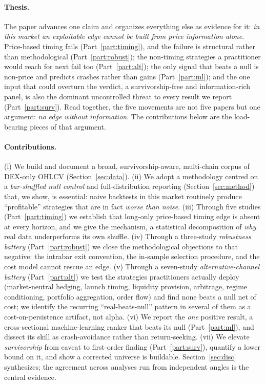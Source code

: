\documentclass[12pt]{article}
\begin{document}
\paragraph{Thesis.} The paper advances one claim and organizes everything else as evidence for it: \emph{in this market an exploitable edge cannot be built from price information alone}. Price-based timing fails (Part~\ref{part:timing}), and the failure is structural rather than methodological (Part~\ref{part:robust}); the non-timing strategies a practitioner would reach for next fail too (Part~\ref{part:alt}); the only signal that beats a null is non-price and predicts crashes rather than gains (Part~\ref{part:ml}); and the one input that could overturn the verdict, a survivorship-free and information-rich panel, is also the dominant uncontrolled threat to every result we report (Part~\ref{part:surv}). Read together, the five movements are not five papers but one argument: \emph{no edge without information}. The contributions below are the load-bearing pieces of that argument.

\paragraph{Contributions.} (i) We build and document a broad, survivorship-aware, multi-chain corpus of DEX-only OHLCV (Section~\ref{sec:data}). (ii) We adopt a methodology centred on a \emph{bar-shuffled null control} and full-distribution reporting (Section~\ref{sec:method}) that, we show, is essential: naive backtests in this market routinely produce ``profitable'' strategies that are in fact \emph{worse than noise}. (iii) Through five studies (Part~\ref{part:timing}) we establish that long-only price-based timing edge is absent at every horizon, and we give the mechanism, a statistical decomposition of \emph{why} real data underperforms its own shuffle. (iv) Through a three-study \emph{robustness battery} (Part~\ref{part:robust}) we close the methodological objections to that negative: the intrabar exit convention, the in-sample selection procedure, and the cost model cannot rescue an edge. (v) Through a seven-study \emph{alternative-channel battery} (Part~\ref{part:alt}) we test the strategies practitioners actually deploy (market-neutral hedging, launch timing, liquidity provision, arbitrage, regime conditioning, portfolio aggregation, order flow) and find none beats a null net of cost; we identify the recurring ``real-beats-null'' pattern in several of them as a cost-on-persistence artifact, not alpha. (vi) We report the \emph{one} positive result, a cross-sectional machine-learning ranker that beats its null (Part~\ref{part:ml}), and dissect its skill as crash-avoidance rather than return-seeking. (vii) We elevate \emph{survivorship} from caveat to first-order finding (Part~\ref{part:surv}), quantify a lower bound on it, and show a corrected universe is buildable. Section~\ref{sec:disc} synthesizes; the agreement across analyses run from independent angles is the central evidence.
\end{document}
